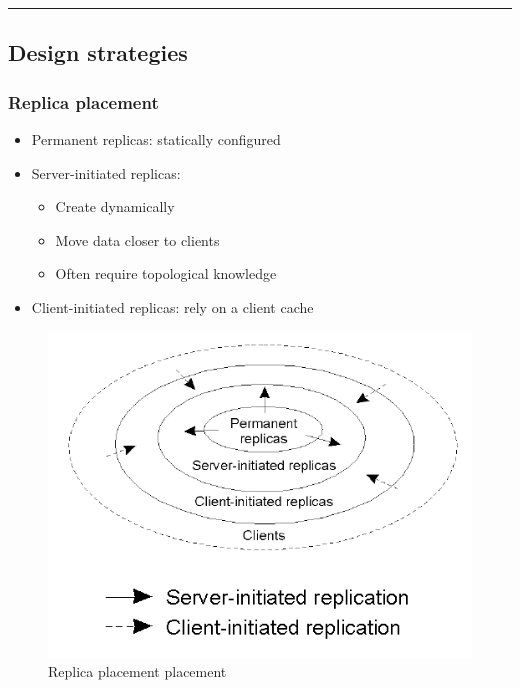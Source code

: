 \begin{center}\rule{3in}{0.4pt}\end{center}

\subsection{Design strategies}\label{design-strategies}

\subsubsection{Replica placement}\label{replica-placement}

\begin{itemize}
    \itemsep1pt\parskip0pt
    \item
      Permanent replicas: statically configured
      
    \item
      Server-initiated replicas:
    \begin{itemize}
        \item
          Create dynamically
        \item
          Move data closer to clients
        \item
          Often require topological knowledge
    \end{itemize}
    
    \item
      Client-initiated replicas: rely on a client cache
\end{itemize}

\begin{figure}[htbp]
    \centering
    \includegraphics[scale=0.7]{src/images/consistency-replication/replica-placement.png}
    \caption{Replica placement placement}
\end{figure}


